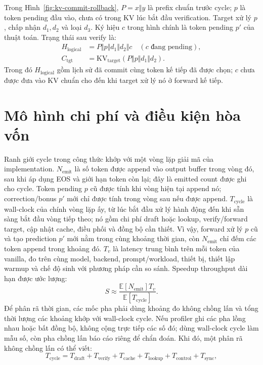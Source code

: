 Trong Hình~\ref{fig:kv-commit-rollback}, $P=x\Vert y$ là prefix chuẩn trước cycle; $p$ là token pending đầu vào, chưa có trong KV lúc bắt đầu verification. Target xử lý $p$, chấp nhận $d_1,d_2$ và loại $d_3$. Ký hiệu $c$ trong hình chính là token pending $p'$ của thuật toán. Trạng thái sau verify là:
\begin{align*}
    H_{\mathrm{logical}} &= P\Vert p\Vert d_1\Vert d_2\Vert c \quad (c\text{ đang pending}),\\
    C_{\mathrm{tgt}} &= \mathrm{KV}_{\mathrm{target}}(P\Vert p\Vert d_1\Vert d_2).
\end{align*}
Trong đó $H_{\mathrm{logical}}$ gồm lịch sử đã commit cùng token kế tiếp đã được chọn; $c$ chưa được đưa vào KV chuẩn cho đến khi target xử lý nó ở forward kế tiếp.

\section{Mô hình chi phí và điều kiện hòa vốn}
Ranh giới cycle trong công thức khớp với một vòng lặp giải mã của implementation. $N_{\mathrm{emit}}$ là số token được append vào output buffer trong vòng đó, sau khi áp dụng EOS và giới hạn token còn lại; đây là emitted count được ghi cho cycle. Token pending $p$ cũ được tính khi vòng hiện tại append nó; correction/bonus $p'$ mới chỉ được tính trong vòng sau nếu được append. $T_{\mathrm{cycle}}$ là wall-clock của chính vòng lặp ấy, từ lúc bắt đầu xử lý hành động đến khi sẵn sàng bắt đầu vòng tiếp theo; nó gồm chi phí draft hoặc lookup, verify/forward target, cập nhật cache, điều phối và đồng bộ cần thiết. Vì vậy, forward xử lý $p$ cũ và tạo prediction $p'$ mới nằm trong cùng khoảng thời gian, còn $N_{\mathrm{emit}}$ chỉ đếm các token append trong khoảng đó. $T_v$ là latency trung bình trên mỗi token của vanilla, đo trên cùng model, backend, prompt/workload, thiết bị, thiết lập warmup và chế độ sinh với phương pháp cần so sánh. Speedup throughput dài hạn được ước lượng:
\begin{equation}
    S \approx \frac{\mathbb{E}[N_{\mathrm{emit}}]T_v}
    {\mathbb{E}[T_{\mathrm{cycle}}]}.
\end{equation}
Để phân rã thời gian, các mốc pha phải dùng khoảng đo không chồng lấn và tổng thời lượng các khoảng khớp với wall-clock cycle. Nếu profiler ghi các pha lồng nhau hoặc bất đồng bộ, không cộng trực tiếp các số đó; dùng wall-clock cycle làm mẫu số, còn pha chồng lấn báo cáo riêng để chẩn đoán. Khi đó, một phân rã không chồng lấn có thể viết:
\begin{equation}
    T_{\mathrm{cycle}}=T_{\mathrm{draft}}+T_{\mathrm{verify}}+T_{\mathrm{cache}}
    +T_{\mathrm{lookup}}+T_{\mathrm{control}}+T_{\mathrm{sync}},
\end{equation}
